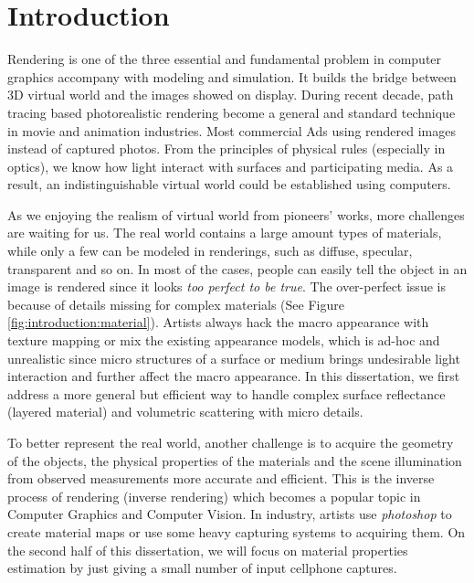 \chapter{Introduction}
\label{cpt:introduction}

Rendering is one of the three essential and fundamental problem in computer graphics accompany with modeling and simulation. It builds the bridge between 3D virtual world and the images showed on display. During recent decade, path tracing based photorealistic rendering become a general and standard technique in movie and animation industries.  Most commercial Ads using rendered images instead of captured photos. From the principles of physical rules (especially in optics), we know how light interact with surfaces and participating media. As a result, an indistinguishable virtual world could be established using computers.  

As we enjoying the realism of virtual world from pioneers' works, more challenges are waiting for us. The real world contains a large amount types of materials, while only a few can be modeled in renderings, such as diffuse, specular, transparent and so on. In most of the cases, people can easily tell the object in an image is rendered since it looks \emph{too perfect to be true}. The over-perfect issue is because of details missing for complex materials (See Figure \ref{fig:introduction:material}). Artists always hack the macro appearance with texture mapping or mix the existing appearance models, which is ad-hoc and unrealistic since micro structures of a surface or medium brings undesirable light interaction and further affect the macro appearance.
In this dissertation, we first address a more general but efficient way to handle complex surface reflectance (layered material) and volumetric scattering with micro details.



To better represent the real world, another challenge is to acquire the geometry of the objects, the physical properties of the materials and the scene illumination from observed measurements more accurate and efficient. This is the inverse process of rendering (inverse rendering) which becomes a popular topic in Computer Graphics and Computer Vision. In industry, artists use \emph{photoshop} to create material maps or use some heavy capturing systems to acquiring them. On the second half of this dissertation, we will focus on material properties estimation by just giving a small number of input cellphone captures.

